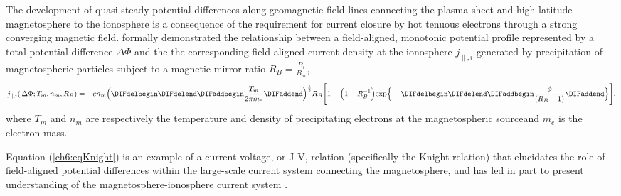   The development of quasi-steady potential differences along geomagnetic field
  lines connecting the plasma sheet and high-latitude magnetosphere to the
  ionosphere is a consequence of the requirement for current closure by hot
  tenuous electrons through a strong converging magnetic
  field. \citet{Knight1973} formally demonstrated the relationship between a
  field-aligned, monotonic potential profile represented by a total potential
  difference $\Delta \Phi$ and the the corresponding field-aligned current
  density at the ionosphere $j_{\parallel,i}$ generated by precipitation of
  magnetospheric particles subject to a magnetic mirror ratio
  $R_B = \frac{B_{i}}{B_{m}}$,
  \begin{equation} \label{ch6:eqKnight} j_{\parallel,i} ( \, \Delta \Phi ; T_m,
    n_m, R_B ) = - e n_m \Big ( \DIFdelbegin %
\DIFdelend \DIFaddbegin \dfrac{T_m}{2 \pi m_e} \DIFaddend \Big )^{\frac{1}{2}}
    R_B \Bigg [ 1 - \Big ( 1 - R_B^{-1} \Big ) \textrm{exp} \Big \{ - \DIFdelbegin %
\DIFdelend \DIFaddbegin \dfrac{\bar{\phi}}{( R_B - 1 )} \DIFaddend \Big \} \Bigg],
  \end{equation}
  where $T_m$ and $n_m$ are respectively the temperature and density of
  precipitating electrons at the magnetospheric source\DIFaddbegin {}\DIFaddend and $m_e$ is the electron mass.


  Equation (\ref{ch6:eqKnight}) is an example of a current-voltage, or J-V,
  relation (specifically the Knight relation) that elucidates the role of
  field-aligned potential differences within the large-scale current system
  connecting the magnetosphere, and has led in part to present understanding of
  the magnetosphere-ionosphere current system
  \citep[e.g.,][]{Temerin1997,Hultqvist1999,Cowley2000,Bostrom2003a,Paschmann2003,Pierrard2007a,Karlsson2012}.

